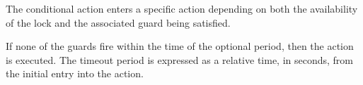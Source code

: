 The conditional  action enters a specific action  depending on both the availability of the lock and the associated guard  being satisfied.

If none of the guards fire within the time of the optional  period, then the  action is executed. The timeout period is expressed as a relative time, in seconds, from the initial entry into the  action.
